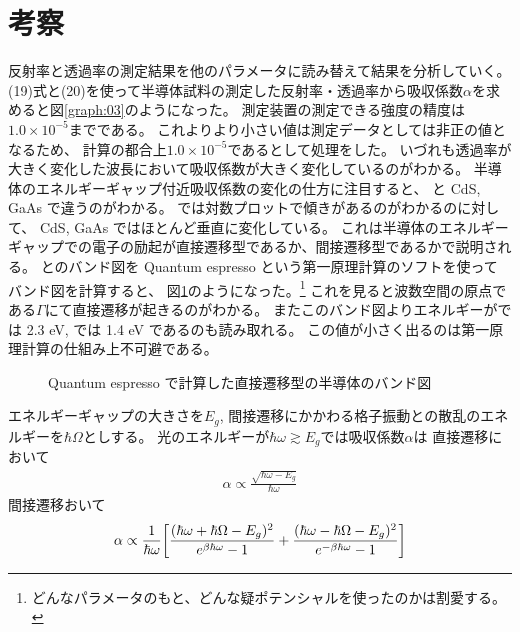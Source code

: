 \documentclass[11pt,dvipdfmx,a4paper]{jsarticle}
\begin{document}
\section{考察}
反射率と透過率の測定結果を他のパラメータに読み替えて結果を分析していく。
(19)式と(20)を使って半導体試料の測定した反射率・透過率から吸収係数\(\alpha\)を求めると図\ref{graph:03}のようになった。
測定装置の測定できる強度の精度は\(1.0\times10^{-5}\)までである。
これよりより小さい値は測定データとしては非正の値となるため、
計算の都合上\(1.0\times10^{-5}\)であるとして処理をした。
いづれも透過率が大きく変化した波長において吸収係数が大きく変化しているのがわかる。
半導体のエネルギーギャップ付近吸収係数の変化の仕方に注目すると、
 と CdS, GaAs で違うのがわかる。 では対数プロットで傾きがあるのがわかるのに対して、
CdS, GaAs ではほとんど垂直に変化している。
これは半導体のエネルギーギャップでの電子の励起が直接遷移型であるか、間接遷移型であるかで説明される。
とのバンド図を Quantum espresso という第一原理計算のソフトを使ってバンド図を計算すると、
図\ref{band}のようになった。\footnote{どんなパラメータのもと、どんな疑ポテンシャルを使ったのかは割愛する。}
これを見ると波数空間の原点である\(\Gamma\)にて直接遷移が起きるのがわかる。
またこのバンド図よりエネルギーがでは 2.3 eV, では 1.4 eV であるのも読み取れる。
この値が小さく出るのは第一原理計算の仕組み上不可避である。\cite{DFT}
\begin{figure}[H]
    \begin{minipage}[t]{0.48\columnwidth}
    \centering
    \end{minipage}
    \hfil
    \begin{minipage}[t]{0.48\columnwidth}
        \centering
    \end{minipage}
    \caption{Quantum espresso で計算した直接遷移型の半導体のバンド図}
    \label{band}
\end{figure}
エネルギーギャップの大きさを\(E_g\), 間接遷移にかかわる格子振動との散乱のエネルギーを\(\hbar\Omega\)としする。
光のエネルギーが\(\hbar\omega \gtrsim E_g\)では吸収係数\(\alpha\)は
直接遷移において
\begin{align}
    \alpha \propto \frac{\sqrt{\hbar\omega -E_g}}{\hbar \omega}
\end{align}
間接遷移おいて
\begin{align}
    \alpha \propto \frac{1}{\hbar\omega}\qty[
        \frac{(\hbar\omega+\hbar\Omega -E_g)^2}{e^{\beta\hbar\omega}-1}
        + \frac{(\hbar\omega-\hbar\Omega -E_g)^2}{e^{-\beta\hbar\omega}-1}
    ]
\end{align}
\end{document}

